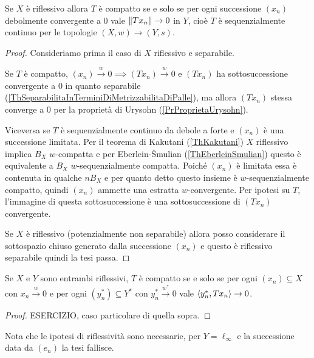 \begin{proposition}\label{PrOperatoreCompattoDominioRiflessivo}
Se $X$ \`e riflessivo allora $T$ \`e compatto se e solo se per ogni successione $(x_n)$ debolmente convergente a $0$ vale $\left\Vert{Tx_n}\right\Vert\to 0$ in $Y$, cio\`e $T$ \`e sequenzialmente continuo per le topologie $(X,w)\to (Y,s)$.
\end{proposition}
\begin{proof}
Consideriamo prima il caso di $X$ riflessivo e separabile. 

Se $T$ \`e compatto, $(x_n)\xrightarrow{w}0\implies (Tx_n)\xrightarrow{w}0$ e $(Tx_n)$ ha sottosuccessione convergente a $0$ in quanto separabile (\ref{ThSeparabilitaInTerminiDiMetrizzabilitaDiPalle}), ma allora $(Tx_n)$ stessa converge a $0$ per la propriet\`a di Urysohn (\ref{PrProprietaUrysohn}).

Viceversa se $T$ \`e sequenzialmente continuo da debole a forte e $(x_n)$ \`e una successione limitata. Per il teorema di Kakutani (\ref{ThKakutani}) $X$ riflessivo implica $B_X$ $w$-compatta e per Eberlein-\v Smulian (\ref{ThEberleinSmulian}) questo \`e equivalente a $B_X$ $w$-sequenzialmente compatta. Poich\'e $(x_n)$ \`e limitata essa \`e contenuta in qualche $nB_X$ e per quanto detto questo insieme \`e $w$-sequenzialmente compatto, quindi $(x_n)$ ammette una estratta $w$-convergente. Per ipotesi su $T$, l'immagine di questa sottosuccessione \`e una sottosuccessione di $(Tx_n)$ convergente.

\medskip

Se $X$ \`e riflessivo (potenzialmente non separabile) allora posso considerare il sottospazio chiuso generato dalla successione $(x_n)$ e questo \`e riflessivo separabile quindi la tesi passa.
\end{proof}


\begin{exercise}
Se $X$ e $Y$ sono entrambi riflessivi, $T$ \`e compatto se e solo se per ogni $(x_n)\subseteq X$ con $x_n\xrightarrow{w}0$ e per ogni $(y_n^\ast)\subseteq Y^\ast$ con $y_n^\ast\xrightarrow{w^\ast}0$ vale $\left\langle {y_n^\ast,T x_n}\right\rangle\to 0$.
\end{exercise}
\begin{proof}
ESERCIZIO, caso particolare di quella sopra.
\end{proof}

\begin{remark}
Nota che le ipotesi di riflessivit\`a sono necessarie, per $Y=\ell_\infty$ e la successione data da $(e_n)$ la tesi fallisce.
\end{remark}


